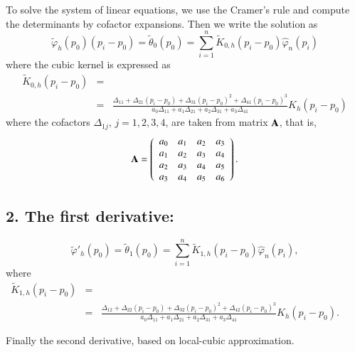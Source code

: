 \documentclass[preprint,12pt]{elsarticle}
\begin{document}
\noindent To solve the system of linear equations, we use the Cramer's rule and compute the determinants by cofactor expansions. Then we write the solution as
\begin{equation}\label{phi.cub}
\widetilde{\varphi}_h(p_0)\left(p_i-p_0\right)= \widetilde{\theta}_0(p_0)=\sum_{i=1}^n \widetilde{K}_{0,h}\left(p_i-p_0\right) \widehat{\varphi}_n\left(p_i\right)
\end{equation}
where the cubic kernel is expressed as
\begin{eqnarray*}
\widetilde{K}_{0,h}\left(p_i-p_0\right)&=& \\
&=&\frac{\Delta_{11}+\Delta_{21}\left(p_i-p_0 \right)+\Delta_{31}\left(p_i-p_0 \right)^2+\Delta_{41}\left(p_i-p_0 \right)^3}{a_0 \Delta_{11}+ a_1 \Delta_{21}+a_2 \Delta_{31}+a_3 \Delta_{41}} K_h\left(p_i-p_0\right)
\end{eqnarray*}
where the cofactors $\Delta_{1j}$, $j=1, 2, 3, 4$, are taken from matrix ${\bf A}$, that is,
\[
{\bf A} =\left(\begin{array}{cccc}
a_0 & a_1&a_2 &a_3 \\ 
a_{1} & a_2&a_3 &a_{4}\\
a_2 & a_3 &a_4 &a_5 \\ 
a_3 & a_4&a_5 &a_{6} 
\end{array}\right).
\]


 

\subsection*{2. The first derivative:} %
\begin{equation}\label{dphi.cub}
\widetilde{\varphi}'_h(p_0)=\widetilde{\theta}_1(p_0)= \sum_{i=1}^n \widetilde{K}_{1,h}\left(p_i-p_0\right) \widehat{\varphi}_n\left(p_i\right),
\end{equation}
where
\begin{eqnarray*}
\widetilde{K}_{1,h}\left(p_i-p_0\right)&=& \\
&=&\frac{\Delta_{12}+\Delta_{22}\left(p_i-p_0 \right)+\Delta_{32}\left(p_i-p_0 \right)^2+\Delta_{42}\left(p_i-p_0 \right)^3}{a_0 \Delta_{11}+ a_1 \Delta_{21}+a_2 \Delta_{31}+a_3 \Delta_{41}}  K_h\left(p_i-p_0\right). \qquad
\end{eqnarray*}


Finally the second derivative, based on local-cubic approximation.
\end{document}
